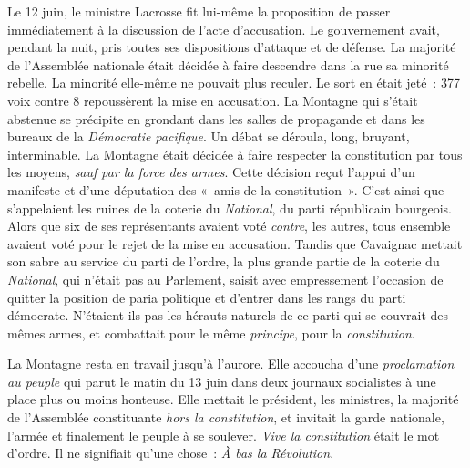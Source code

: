 \documentclass[twoside]{book} %
\begin{document}
Le 12 juin, le ministre Lacrosse fit lui-même la proposition de passer immédiatement à la discussion de l’acte d’accusation. Le gouvernement avait, pendant la nuit, pris toutes ses dispositions d’attaque et de défense. La majorité de l’Assemblée nationale était décidée à faire descendre dans la rue sa minorité rebelle. La minorité elle-même ne pouvait plus reculer. Le sort en était jeté : 377 voix contre 8 repoussèrent la mise en accusation. La Montagne qui s’était abstenue se précipite en grondant dans les salles de propagande et dans les bureaux de la \emph{Démocratie pacifique}. Un débat se déroula, long, bruyant, interminable. La Montagne était décidée à faire respecter la constitution par tous les moyens, \emph{sauf par la force des armes}. Cette décision reçut l’appui d’un manifeste et d’une députation des « amis de la constitution ». C’est ainsi que s’appelaient les ruines de la coterie du \emph{National}, du parti républicain bourgeois. Alors que six de ses représentants avaient voté \emph{contre}, les autres, tous ensemble avaient voté pour le rejet de la mise en accusation. Tandis que Cavaignac mettait son sabre au service du parti de l’ordre, la plus grande partie de la coterie du \emph{National}, qui n’était pas au Parlement, saisit avec empressement l’occasion de quitter la position de paria politique et d’entrer dans les rangs du parti démocrate. N’étaient-ils pas les hérauts naturels de ce parti qui se couvrait des mêmes armes, et combattait pour le même \emph{principe}, pour la \emph{constitution}.\par
La Montagne resta en travail jusqu’à l’aurore. Elle accoucha d’une \emph{proclamation au peuple} qui parut le matin du 13 juin dans deux journaux socialistes à une place plus ou moins honteuse. Elle mettait le président, les ministres, la majorité de l’Assemblée constituante \emph{hors la constitution}, et invitait la garde nationale, l’armée et finalement le peuple à se soulever. \emph{Vive la constitution} était le mot d’ordre. Il ne signifiait qu’une chose : \emph{À bas la Révolution}.\par
\end{document}
